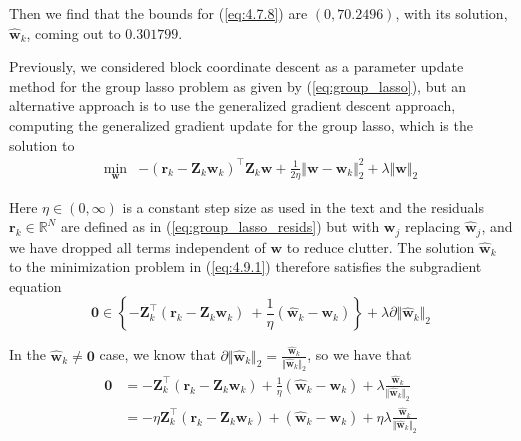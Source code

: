 \documentclass{article}
\numberwithin{equation}{section}
\begin{document}
Then we find that the bounds for (\ref{eq:4.7.8}) are $ (0, 70.2496) $, with its solution, $ \hat{\mathbf{w}}_k $, coming out to $ 0.301799 $.


Previously, we considered block coordinate descent as a parameter update
method for the group lasso problem as given by (\ref{eq:group_lasso}), but an
alternative approach is to use the generalized gradient descent approach,
computing the generalized gradient update for the group lasso, which is the
solution to
\begin{equation} \label{eq:4.9.1}
    \begin{array}{ll}
        \displaystyle\min_\mathbf{w} &
        -(\mathbf{r}_k - \mathbf{Z}_k\mathbf{w}_k)^\top
        \mathbf{Z}_k\mathbf{w} + \frac{1}{2\eta}\Vert\mathbf{w} -
        \mathbf{w}_k\Vert_2^2 + \lambda\Vert\mathbf{w}\Vert_2
    \end{array}
\end{equation}

Here $ \eta \in (0, \infty) $ is a constant step size as used in the text and
the residuals $ \mathbf{r}_k \in \mathbb{R}^N $ are defined as in
(\ref{eq:group_lasso_resids}) but with $ \mathbf{w}_j $ replacing
$ \hat{\mathbf{w}}_j $, and we have dropped all terms independent of
$ \mathbf{w} $ to reduce clutter. The solution $ \hat{\mathbf{w}}_k $ to the
minimization problem in (\ref{eq:4.9.1}) therefore satisfies the subgradient
equation
\begin{equation} \label{eq:4.9.2}
    \mathbf{0} \in
    \left\{
        -\mathbf{Z}_k^\top(\mathbf{r}_k - \mathbf{Z}_k\mathbf{w}_k)\ +
        \frac{1}{\eta}(\hat{\mathbf{w}}_k - \mathbf{w}_k)
    \right\} +
    \lambda\partial\Vert\hat{\mathbf{w}}_k\Vert_2
\end{equation}

In the $ \hat{\mathbf{w}}_k \ne \mathbf{0} $ case, we know that
$ \partial\Vert\hat{\mathbf{w}}_k\Vert_2 =
\frac{\hat{\mathbf{w}}_k}{\Vert\hat{\mathbf{w}}_k\Vert_2} $, so we have that
\begin{equation} \label{eq:4.9.3}
    \begin{split}
        \mathbf{0} & =
        -\mathbf{Z}_k^\top(\mathbf{r}_k - \mathbf{Z}_k\mathbf{w}_k) +
        \frac{1}{\eta}(\hat{\mathbf{w}}_k - \mathbf{w}_k) +
        \lambda
        \frac{\hat{\mathbf{w}}_k}{\Vert\hat{\mathbf{w}}_k\Vert_2} \\ & =
        -\eta\mathbf{Z}_k^\top(\mathbf{r}_k - \mathbf{Z}_k\mathbf{w}_k) +
        (\hat{\mathbf{w}}_k - \mathbf{w}_k) +
        \eta\lambda
        \frac{\hat{\mathbf{w}}_k}{\Vert\hat{\mathbf{w}}_k\Vert_2}
    \end{split}
\end{equation}
\end{document}
